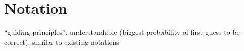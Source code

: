 \section{Notation}
\label{sec:notation}



``guiding principles'': understandable (biggest probability of first guess to be correct), similar to existing notations~\cite{GraphBLASv13}



